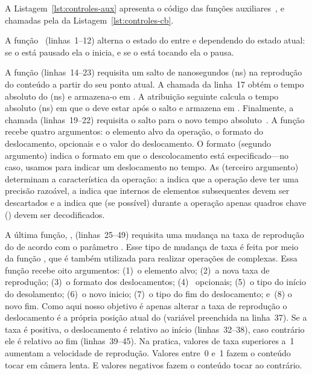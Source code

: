 \documentclass{SBCbookchapter}
\begin{document}


A Listagem~\ref{lst:controles-aux} apresenta o código das funções
auxiliares~,  e~ chamadas pela
  da Listagem~\ref{lst:controles-cb}.

A função~ (linhas~1--12) alterna o estado do 
entre  e  dependendo do estado atual:  se o
 está pausado ela o inicia, e se o  está tocando
ela o pausa.

A função  (linhas~14--23) requisita um salto de 
nanosegundos (ns) na reprodução do conteúdo a partir do seu ponto atual.
A chamada da linha~17 obtém o tempo absoluto do  (ns) e
armazena-o em .  A atribuição seguinte calcula o tempo absoluto (ns)
em que o  deve estar após o salto e armazena em .
Finalmente, a chamada  (linhas~19--22) requisita
o salto para o novo tempo absoluto~.  A função
 recebe quatro argumentos: o elemento alvo da
operação, o formato do deslocamento,  opcionais e o valor do
deslocamento.  O formato (segundo argumento) indica o formato em que o
descolocamento está especificado---no caso, usamos  para
indicar um deslocamento no tempo.  As  (terceiro argumento)
determinam a característica da operação: a 
 indica que a operação deve ter uma precisão
razoável, a   indica que 
internos de elementos subsequentes devem ser descartados e a 
 indica que (se possível) durante a operação apenas
quadros chave () devem ser decodificados.

A última função, , (linhas~25--49) requisita uma mudança na taxa de
reprodução do  de acordo com o parâmetro .  Esse tipo
de mudança de taxa é feita por meio da função , que é
também utilizada para realizar operações de  complexas.  Essa
função recebe oito argumentos: (1)~o elemento alvo; (2)~a nova taxa de
reprodução; (3)~o formato dos deslocamentos; (4)~ opcionais; (5)~o
tipo do início do desolamento; (6)~o novo inicio; (7)~o tipo do fim do
deslocamento; e~(8) o novo fim.  Como aqui nosso objetivo é apenas alterar a
taxa de reprodução o deslocamento é a própria posição atual do 
(variável  preenchida na linha~37).  Se a taxa é positiva, o
deslocamento é relativo ao início (linhas~32--38), caso contrário
ele é relativo ao fim (linhas~39--45).  Na pratica, valores de taxa
superiores a~1 aumentam a velocidade de reprodução.  Valores entre~0 e~1
fazem o conteúdo tocar em câmera lenta.  E valores negativos fazem o
conteúdo tocar ao contrário.
\end{document}
